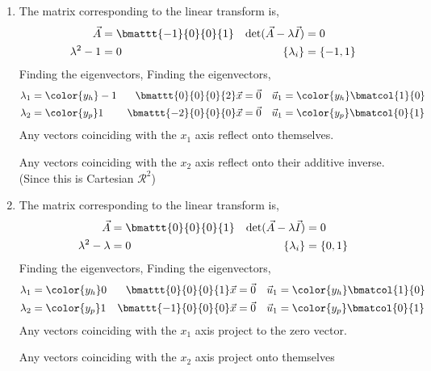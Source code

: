 \begin{enumerate}
    \item The matrix corresponding to the linear transform is,
          \begin{align}
              \vec{A}                        & = \bmattt{-1}{0}{0}{1} &
              \det(\vec{A} - \lambda\vec{I}) & = 0                      \\
              \lambda^2 - 1                  & = 0                    &
              \{\lambda_i\}                  & = \{-1, 1\}
          \end{align}
          Finding the eigenvectors,
          Finding the eigenvectors,
          \begin{align}
              \lambda_1                    & = \color{y_h} -1 &
              \bmattt{0}{0}{0}{2} \vec{x}  & = \vec{0}        &
              \vec{u}_1                    & = \color{y_h}
              \bmatcol{1}{0}                                    \\
              \lambda_2                    & = \color{y_p} 1  &
              \bmattt{-2}{0}{0}{0} \vec{x} & = \vec{0}        &
              \vec{u}_1                    & = \color{y_p}
              \bmatcol{0}{1}
          \end{align}
          Any vectors coinciding with the $ x_1 $ axis reflect onto themselves. \par
          Any vectors coinciding with the $ x_2 $ axis reflect onto their additive
          inverse. (Since this is Cartesian $ \mathcal{R}^2 $)

    \item The matrix corresponding to the linear transform is,
          \begin{align}
              \vec{A}                        & = \bmattt{0}{0}{0}{1} &
              \det(\vec{A} - \lambda\vec{I}) & = 0                     \\
              \lambda^2 - \lambda            & = 0                   &
              \{\lambda_i\}                  & = \{0, 1\}
          \end{align}
          Finding the eigenvectors,
          Finding the eigenvectors,
          \begin{align}
              \lambda_1                    & = \color{y_h} 0 &
              \bmattt{0}{0}{0}{1} \vec{x}  & = \vec{0}       &
              \vec{u}_1                    & = \color{y_h}
              \bmatcol{1}{0}                                   \\
              \lambda_2                    & = \color{y_p} 1 &
              \bmattt{-1}{0}{0}{0} \vec{x} & = \vec{0}       &
              \vec{u}_1                    & = \color{y_p}
              \bmatcol{0}{1}
          \end{align}
          Any vectors coinciding with the $ x_1 $ axis project to the zero vector. \par
          Any vectors coinciding with the $ x_2 $ axis project onto themselves


\end{enumerate}
